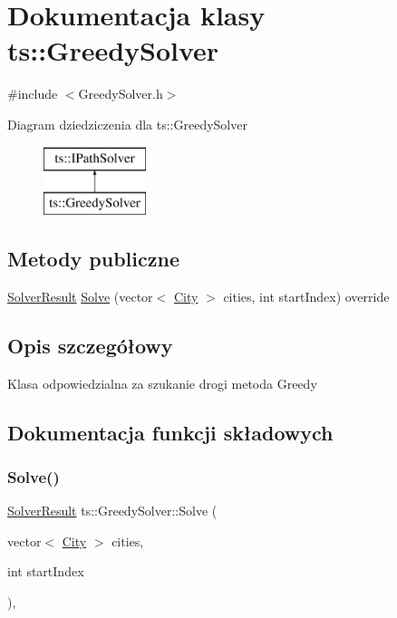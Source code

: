 \hypertarget{classts_1_1_greedy_solver}{}\section{Dokumentacja klasy ts\+:\+:Greedy\+Solver}
\label{classts_1_1_greedy_solver}


{\ttfamily \#include $<$Greedy\+Solver.\+h$>$}

Diagram dziedziczenia dla ts\+:\+:Greedy\+Solver\begin{figure}[H]
\begin{center}
\leavevmode
\includegraphics[height=2.000000cm]{classts_1_1_greedy_solver}
\end{center}
\end{figure}
\subsection*{Metody publiczne}
\begin{DoxyCompactItemize}
\item 
\mbox{\hyperlink{structts_1_1_solver_result}{Solver\+Result}} \mbox{\hyperlink{classts_1_1_greedy_solver_aa529740e0eaaadcd725e0ce23a34542f}{Solve}} (vector$<$ \mbox{\hyperlink{classts_1_1_city}{City}} $>$ cities, int start\+Index) override
\end{DoxyCompactItemize}


\subsection{Opis szczegółowy}
Klasa odpowiedzialna za szukanie drogi metoda Greedy 

\subsection{Dokumentacja funkcji składowych}
\mbox{\label{classts_1_1_greedy_solver_aa529740e0eaaadcd725e0ce23a34542f}} 
\subsubsection{\texorpdfstring{Solve()}{Solve()}}
{\footnotesize\ttfamily \mbox{\hyperlink{structts_1_1_solver_result}{Solver\+Result}} ts\+::\+Greedy\+Solver\+::\+Solve (\begin{DoxyParamCaption}\item[{vector$<$ \mbox{\hyperlink{classts_1_1_city}{City}} $>$}]{cities,  }\item[{int}]{start\+Index }\end{DoxyParamCaption})\hspace{0.3cm}{\ttfamily [override]}, {\ttfamily [virtual]}}

